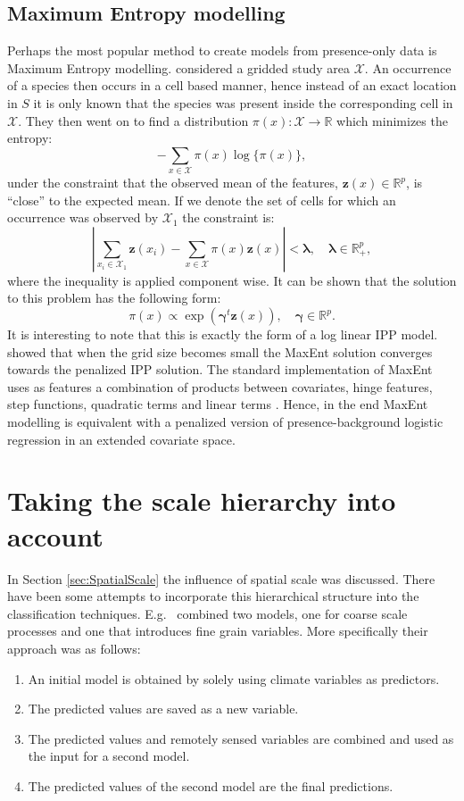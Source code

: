 \subsection{Maximum Entropy modelling}
\label{sec:MaximumEntropyModeling}
Perhaps the most popular method to create models from presence-only data is Maximum Entropy modelling. \cite{phillips_maximum_2006} considered a gridded study area $\mathcal{X}$. An occurrence of a species then occurs in a cell based manner, hence instead of an exact location in $S$ it is only known that the species was present inside the corresponding cell in $\mathcal{X}$. They then went on to find a distribution $\pi(x): \mathcal{X} \to \mathbb{R}$ which minimizes the entropy: 
\[ - \sum_{x\in\mathcal{X}} \pi(x) \log \{\pi(x)\},  \]
under the constraint that the observed mean of the features, $\bm{z}(x) \in \mathbb{R}^p$, is ``close'' to the expected mean. If we denote the set of cells for which an occurrence was observed by $\mathcal{X}_1$ the constraint is:
\[\left| \sum_{x_i \in \mathcal{X}_1} \bm{z}(x_i)  - \sum_{x \in \mathcal{X}} \pi(x)\bm{z}(x) \right| < \bm{\lambda}, \quad \bm{\lambda} \in \mathbb{R}^p_+,\]
where the inequality is applied component wise. It can be shown that the solution to this problem has the following form:
\[\pi(x) \propto \exp (\bm{\gamma}^t\bm{z}(x)), \quad \bm{\gamma} \in \mathbb{R}^p.\]
It is interesting to note that this is exactly the form of a log linear IPP model. \cite{renner_equivalence_2013} showed that when the grid size becomes small the MaxEnt solution converges towards the penalized IPP solution. The standard implementation of MaxEnt uses as features a combination of products between covariates, hinge features, step functions, quadratic terms and linear terms \parencite{phillips_modeling_2008}. Hence, in the end MaxEnt modelling is equivalent with a penalized version of presence-background logistic regression in an extended covariate space. \\

\section{Taking the scale hierarchy into account}
\label{sec:TakingTheScaleHierarchyIntoAccount}
In Section \ref{sec:SpatialScale} the influence of spatial scale was discussed. There have been some attempts to incorporate this hierarchical structure into the classification techniques. E.g.\ \cite{pearson_modelling_2004} combined two models, one for coarse scale processes and one that introduces fine grain variables. More specifically their approach was as follows: \\
\begin{enumerate}
\item An initial model is obtained by solely using climate variables as predictors.
\item The predicted values are saved as a new variable.
\item The predicted values and remotely sensed variables are combined and used as the input for a second model.
\item The predicted values of the second model are the final predictions.
\end{enumerate}

